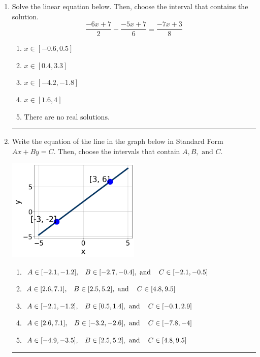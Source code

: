 \documentclass[14pt]{extbook}
\newcommand{\litem}[1]{\item#1\hspace*{-1cm}\rule{\textwidth}{0.4pt}}
\begin{document}
\begin{enumerate}
{\begin{enumerate}[label=\Alph*.]
\end{enumerate} }
\litem{
Solve the linear equation below. Then, choose the interval that contains the solution.\[ \frac{-6x + 7}{2} - \frac{-5x + 7}{6} = \frac{-7x + 3}{8} \]\begin{enumerate}[label=\Alph*.]
\item \( x \in [-0.6, 0.5] \)
\item \( x \in [0.4, 3.3] \)
\item \( x \in [-4.2, -1.8] \)
\item \( x \in [1.6, 4] \)
\item \( \text{There are no real solutions.} \)

\end{enumerate} }
\litem{
Write the equation of the line in the graph below in Standard Form $Ax+By=C$. Then, choose the intervals that contain $A, B, \text{ and } C$.
\begin{center}
    \includegraphics[width=0.5\textwidth]{../Figures/linearGraphToStandardCopyB.png}
\end{center}
\begin{enumerate}[label=\Alph*.]
\item \( A \in [-2.1, -1.2], \hspace{3mm} B \in [-2.7, -0.4], \text{ and } \hspace{3mm} C \in [-2.1, -0.5] \)
\item \( A \in [2.6, 7.1], \hspace{3mm} B \in [2.5, 5.2], \text{ and } \hspace{3mm} C \in [4.8, 9.5] \)
\item \( A \in [-2.1, -1.2], \hspace{3mm} B \in [0.5, 1.4], \text{ and } \hspace{3mm} C \in [-0.1, 2.9] \)
\item \( A \in [2.6, 7.1], \hspace{3mm} B \in [-3.2, -2.6], \text{ and } \hspace{3mm} C \in [-7.8, -4] \)
\item \( A \in [-4.9, -3.5], \hspace{3mm} B \in [2.5, 5.2], \text{ and } \hspace{3mm} C \in [4.8, 9.5] \)


\end{enumerate}}
\end{enumerate}
\end{document}
